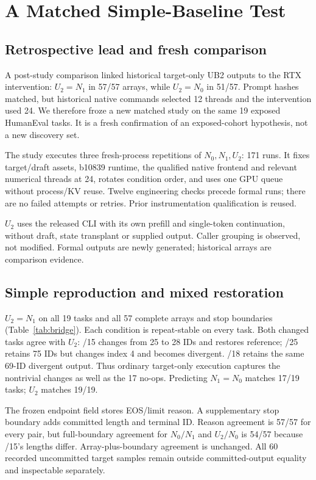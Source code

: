 \section{A Matched Simple-Baseline Test}
\label{sec:bridge}
\subsection{Retrospective lead and fresh comparison}
A post-study comparison linked historical target-only UB2 outputs to the RTX intervention: $U_2=N_1$ in 57/57 arrays, while $U_2=N_0$ in 51/57. Prompt hashes matched, but historical native commands selected 12 threads and the intervention used 24. We therefore froze a new matched study on the same 19 exposed HumanEval tasks. It is a fresh confirmation of an exposed-cohort hypothesis, not a new discovery set.

The study executes three fresh-process repetitions of $N_0,N_1,U_2$: 171 runs. It fixes target/draft assets, b10839 runtime, the qualified native frontend and relevant numerical threads at 24, rotates condition order, and uses one GPU queue without process/KV reuse. Twelve engineering checks precede formal runs; there are no failed attempts or retries. Prior instrumentation qualification is reused.

$U_2$ uses the released CLI with its own prefill and single-token continuation, without draft, state transplant or supplied output. Caller grouping is observed, not modified. Formal outputs are newly generated; historical arrays are comparison evidence.


\subsection{Simple reproduction and mixed restoration}
$U_2=N_1$ on all 19 tasks and all 57 complete arrays and stop boundaries (Table~\ref{tab:bridge}). Each condition is repeat-stable on every task. Both changed tasks agree with $U_2$: /15 changes from 25 to 28 IDs and restores reference; /25 retains 75 IDs but changes index 4 and becomes divergent. /18 retains the same 69-ID divergent output. Thus ordinary target-only execution captures the nontrivial changes as well as the 17 no-ops. Predicting $N_1=N_0$ matches 17/19 tasks; $U_2$ matches 19/19.

The frozen endpoint field stores EOS/limit reason. A supplementary stop boundary adds committed length and terminal ID. Reason agreement is 57/57 for every pair, but full-boundary agreement for $N_0/N_1$ and $U_2/N_0$ is 54/57 because /15's lengths differ. Array-plus-boundary agreement is unchanged. All 60 recorded uncommitted target samples remain outside committed-output equality and inspectable separately.

